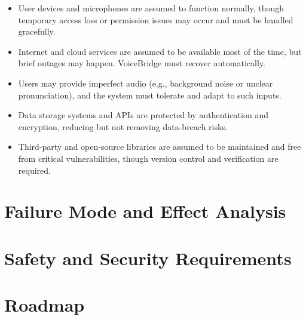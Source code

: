 \documentclass{article}
\begin{document}
\begin{itemize}
    \item User devices and microphones are assumed to function normally, though temporary access loss or permission issues may occur and must be handled gracefully.
    
    \item Internet and cloud services are assumed to be available most of the time, but brief outages may happen. VoiceBridge must recover automatically.
    
    \item Users may provide imperfect audio (e.g., background noise or unclear pronunciation), and the system must tolerate and adapt to such inputs.
    
    \item Data storage systems and APIs are protected by authentication and encryption, reducing but not removing data-breach risks.
    
    \item Third-party and open-source libraries are assumed to be maintained and free from critical vulnerabilities, though version control and verification are required.
\end{itemize}


\section{Failure Mode and Effect Analysis}


\section{Safety and Security Requirements}


\section{Roadmap}
\end{document}
